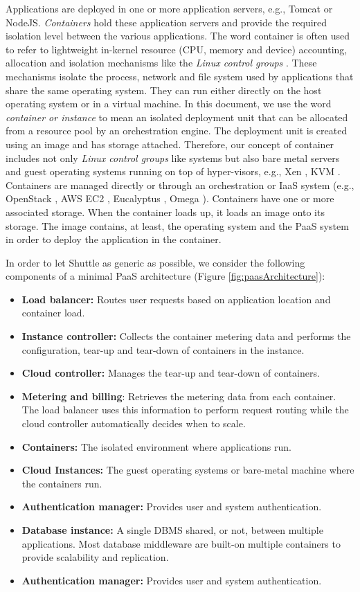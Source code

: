 Applications are deployed in one or more application servers, e.g., Tomcat or NodeJS. \emph{Containers} \cite{Lenk2009} hold these application servers and provide the required isolation level between the various applications. The word container is often used to refer to lightweight in-kernel resource (CPU, memory and device) accounting, allocation and isolation mechanisms like the \textit{Linux control groups} \cite{Menage2007}. These mechanisms isolate the process, network and file system used by applications that share the same operating system. They can run either directly on the host operating system or in a virtual machine. In this document, we use the word \textit{container or instance} to mean an isolated deployment unit that can be allocated from a resource pool by an orchestration engine. The deployment unit is created using an image and has storage attached. Therefore, our concept of container includes not only \textit{Linux control groups} like systems but also bare metal servers and guest operating systems running on top of hyper-visors, e.g., Xen \cite{xen}, KVM \cite{kvm}. Containers are managed directly or through an orchestration or IaaS system (e.g., OpenStack \cite{openstack}, \ac{AWS} \ac{EC2} \cite{aws}, Eucalyptus \cite{eucalyptus}, Omega \cite{omega}). Containers have one or more associated storage. When the container loads up, it loads an image onto its storage. The image contains, at least, the operating system and the \ac{PaaS} system in order to deploy the application in the container. 

In order to let Shuttle as generic as possible, we consider the following components of a minimal \ac{PaaS} architecture (Figure \ref{fig:paasArchitecture}):
\begin{itemize}
\item \textbf{Load balancer:} Routes user requests based on application location and container load.
\item \textbf{Instance controller:} Collects the container metering data and performs the configuration, tear-up and tear-down of containers in the instance.
\item \textbf{Cloud controller:} Manages the tear-up and tear-down of containers.
\item \textbf{Metering and billing}: Retrieves the metering data from each container. The load balancer uses this information to perform request routing while the cloud controller automatically decides when to scale.
\item \textbf{Containers:} The isolated environment where applications run.
\item \textbf{Cloud Instances:} The guest operating systems or bare-metal machine where the containers run.
\item \textbf{Authentication manager:} Provides user and system authentication.
\item \textbf{Database instance:} A single \ac{DBMS} shared, or not, between multiple applications. Most database middleware are built-on multiple containers to provide scalability and replication.
\item \textbf{Authentication manager:} Provides user and system authentication.
\end{itemize}

